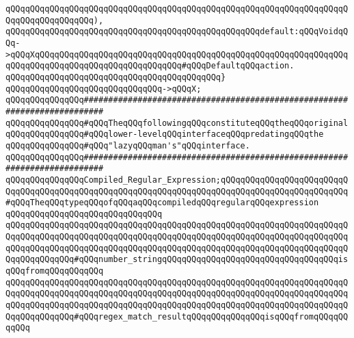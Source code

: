 \verb|qQQqqQQqqQQqqQQqqQQqqQQqqQQqqQQqqQQqqQQqqQQqqQQqqQQqqQQqqQQqqQQqqQQqqQQqqQQqqQQqqQQqqQQq),|\newline
\newline
\verb|qQQqqQQqqQQqqQQqqQQqqQQqqQQqqQQqqQQqqQQqqQQqqQQqqQQqdefault:qQQqVoidqQQq->qQQqXqQQqqQQqqQQqqQQqqQQqqQQqqQQqqQQqqQQqqQQqqQQqqQQqqQQqqQQqqQQqqQQqqQQqqQQqqQQqqQQqqQQqqQQqqQQqqQQqqQQq#qQQqDefaultqQQqaction.|\newline
\verb|qQQqqQQqqQQqqQQqqQQqqQQqqQQqqQQqqQQqqQQqqQQq}|\newline
\verb|qQQqqQQqqQQqqQQqqQQqqQQqqQQqqQQq->qQQqX;|\newline
\newline
\newline
\newline
\verb|qQQqqQQqqQQqqQQq##########################################################################|\newline
\verb|qQQqqQQqqQQqqQQq#qQQqTheqQQqfollowingqQQqconstituteqQQqtheqQQqoriginal|\newline
\verb|qQQqqQQqqQQqqQQq#qQQqlower-levelqQQqinterfaceqQQqpredatingqQQqthe|\newline
\verb|qQQqqQQqqQQqqQQq#qQQq"lazyqQQqman's"qQQqinterface.|\newline
\verb|qQQqqQQqqQQqqQQq##########################################################################|\newline
\newline
\verb|qQQqqQQqqQQqqQQqCompiled_Regular_Expression;qQQqqQQqqQQqqQQqqQQqqQQqqQQqqQQqqQQqqQQqqQQqqQQqqQQqqQQqqQQqqQQqqQQqqQQqqQQqqQQqqQQqqQQqqQQqqQQq#qQQqTheqQQqtypeqQQqofqQQqaqQQqcompiledqQQqregularqQQqexpression|\newline
\verb|qQQqqQQqqQQqqQQqqQQqqQQqqQQqqQQq|\newline
\newline
\verb|qQQqqQQqqQQqqQQqqQQqqQQqqQQqqQQqqQQqqQQqqQQqqQQqqQQqqQQqqQQqqQQqqQQqqQQqqQQqqQQqqQQqqQQqqQQqqQQqqQQqqQQqqQQqqQQqqQQqqQQqqQQqqQQqqQQqqQQqqQQqqQQqqQQqqQQqqQQqqQQqqQQqqQQqqQQqqQQqqQQqqQQqqQQqqQQqqQQqqQQqqQQqqQQqqQQqqQQqqQQqqQQq#qQQqnumber_stringqQQqqQQqqQQqqQQqqQQqqQQqqQQqqQQqqQQqisqQQqfromqQQqqQQqqQQq|\newline
\verb|qQQqqQQqqQQqqQQqqQQqqQQqqQQqqQQqqQQqqQQqqQQqqQQqqQQqqQQqqQQqqQQqqQQqqQQqqQQqqQQqqQQqqQQqqQQqqQQqqQQqqQQqqQQqqQQqqQQqqQQqqQQqqQQqqQQqqQQqqQQqqQQqqQQqqQQqqQQqqQQqqQQqqQQqqQQqqQQqqQQqqQQqqQQqqQQqqQQqqQQqqQQqqQQqqQQqqQQqqQQqqQQq#qQQqregex_match_resultqQQqqQQqqQQqqQQqisqQQqfromqQQqqQQqqQQq|\newline
